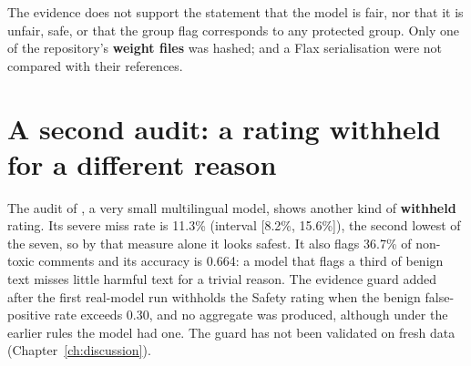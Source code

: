 The evidence does not support the statement that the model is fair, nor that it is unfair, safe, or that the group flag corresponds to any protected group. Only one of the repository's \textbf{weight files} was hashed;  and a Flax serialisation were not compared with their references.

\section{A second audit: a rating withheld for a different reason}\label{sec:exsecond}
The audit of , a very small multilingual model, shows another kind of \textbf{withheld} rating. Its severe miss rate is 11.3\% (interval [8.2\%, 15.6\%]), the second lowest of the seven, so by that measure alone it looks safest. It also flags 36.7\% of non-toxic comments and its accuracy is 0.664: a model that flags a third of benign text misses little harmful text for a trivial reason. The evidence guard added after the first real-model run withholds the Safety rating when the benign false-positive rate exceeds 0.30, and no aggregate was produced, although under the earlier rules the model had one. The guard has not been validated on fresh data (Chapter~\ref{ch:discussion}).
